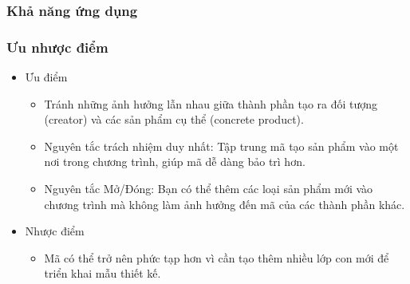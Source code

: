 \subsubsection{Khả năng ứng dụng}
\begin{flushleft}

\end{flushleft}

\subsubsection{Ưu nhược điểm}
\begin{flushleft}
    \begin{itemize}
        \item Ưu điểm
            \begin{itemize}
                \item Tránh những ảnh hưởng lẫn nhau giữa thành phần tạo ra đối tượng (creator) và các sản phẩm cụ thể (concrete product).
                \item Nguyên tắc trách nhiệm duy nhất: Tập trung mã tạo sản phẩm vào một nơi trong chương trình, giúp mã dễ dàng bảo trì hơn.
                \item Nguyên tắc Mở/Đóng: Bạn có thể thêm các loại sản phẩm mới vào chương trình mà không làm ảnh hưởng đến mã của các thành phần khác.
            \end{itemize}
        \item Nhược điểm
            \begin{itemize}
                \item Mã có thể trở nên phức tạp hơn vì cần tạo thêm nhiều lớp con mới để triển khai mẫu thiết kế.
            \end{itemize}
    \end{itemize}

\end{flushleft}